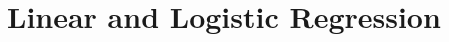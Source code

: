 \chapter{Linear and Logistic Regression}

\begin{ex}
\end{ex}

\begin{ex}
\end{ex}

\begin{ex}
\end{ex}

\begin{ex}
\end{ex}

\begin{ex}
\end{ex}

\begin{ex}
\end{ex}

\begin{ex}
\end{ex}

\begin{ex}
\end{ex}

\begin{ex}
\end{ex}

\begin{ex}
\end{ex}

\begin{ex}
\end{ex}